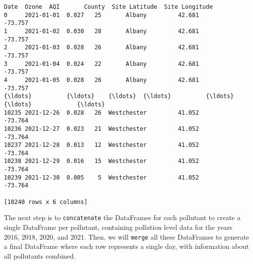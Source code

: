 \documentclass[11pt]{article}
\makeatletter
\newcommand{\boxspacing}{\kern\kvtcb@left@rule\kern\kvtcb@boxsep}
\newcommand{\prompt}[4]{
        {\ttfamily\llap{{\color{#2}[#3]:\hspace{3pt}#4}}\vspace{-\baselineskip}}
    }
\makeatother
\begin{document}
            \begin{tcolorbox}[breakable, size=fbox, boxrule=.5pt, pad at break*=1mm, opacityfill=0]
\prompt{Out}{outcolor}{7}{\boxspacing}
\begin{Verbatim}[commandchars=\\\{\}]
            Date  Ozone  AQI       County  Site Latitude  Site Longitude
0     2021-01-01  0.027   25       Albany         42.681         -73.757
1     2021-01-02  0.030   28       Albany         42.681         -73.757
2     2021-01-03  0.028   26       Albany         42.681         -73.757
3     2021-01-04  0.024   22       Albany         42.681         -73.757
4     2021-01-05  0.028   26       Albany         42.681         -73.757
{\ldots}          {\ldots}    {\ldots}  {\ldots}          {\ldots}            {\ldots}             {\ldots}
10235 2021-12-26  0.028   26  Westchester         41.052         -73.764
10236 2021-12-27  0.023   21  Westchester         41.052         -73.764
10237 2021-12-28  0.013   12  Westchester         41.052         -73.764
10238 2021-12-29  0.016   15  Westchester         41.052         -73.764
10239 2021-12-30  0.005    5  Westchester         41.052         -73.764

[10240 rows x 6 columns]
\end{Verbatim}
\end{tcolorbox}
        
    The next step is to \texttt{concatenate} the DataFrames for each
pollutant to create a single DataFrame per pollutant, containing
pollution level data for the years 2016, 2018, 2020, and 2021. Then, we
will \texttt{merge} all these DataFrames to generate a final DataFrame
where each row represents a single day, with information about all
pollutants combined.
\end{document}
